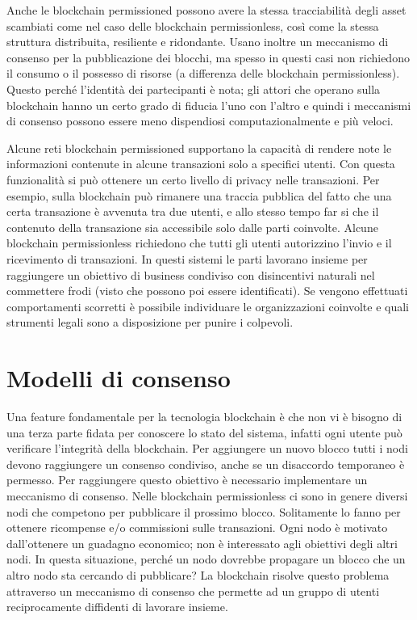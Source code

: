 Anche le blockchain permissioned possono avere la stessa tracciabilità degli asset
scambiati come nel caso delle blockchain permissionless,
così come la stessa struttura distribuita, resiliente e ridondante.
Usano inoltre un meccanismo di consenso per la pubblicazione dei blocchi, ma spesso in questi casi
non richiedono il consumo o il possesso di risorse (a differenza delle blockchain permissionless).
Questo perché l'identità dei partecipanti è nota; gli attori che operano sulla blockchain hanno
un certo grado di fiducia l'uno con l'altro e quindi i meccanismi di consenso possono essere
meno dispendiosi computazionalmente e più veloci.

Alcune reti blockchain permissioned supportano la capacità di rendere note
le informazioni contenute in alcune transazioni solo a specifici utenti.
Con questa funzionalità si può ottenere un certo livello di privacy nelle transazioni. Per esempio,
sulla blockchain può rimanere una traccia pubblica del fatto che una certa transazione è avvenuta tra
due utenti,  e allo stesso tempo far si che il contenuto della transazione
sia accessibile solo dalle parti coinvolte.
Alcune blockchain permissionless richiedono che tutti gli utenti autorizzino l'invio e il
ricevimento di transazioni.
In questi sistemi le parti lavorano insieme per raggiungere un obiettivo
di business condiviso con disincentivi naturali nel commettere frodi (visto che possono poi essere identificati).
Se vengono effettuati comportamenti scorretti è possibile individuare le organizzazioni coinvolte e quali
strumenti legali sono a disposizione per punire i colpevoli.


\section{Modelli di consenso}
\label{intro:modelli-consenso}
Una feature fondamentale per la tecnologia blockchain è che non vi è bisogno di una terza parte fidata
per conoscere lo stato del sistema, infatti ogni utente può verificare l'integrità della blockchain.
Per aggiungere un nuovo blocco tutti i nodi devono raggiungere un consenso condiviso, anche se un
disaccordo temporaneo è permesso. Per raggiungere questo obiettivo è necessario implementare un meccanismo
di consenso. Nelle blockchain permissionless ci sono in genere diversi nodi che competono per pubblicare
il prossimo blocco. Solitamente lo fanno per ottenere ricompense e/o commissioni sulle transazioni.
Ogni nodo è motivato dall'ottenere un guadagno economico; non è interessato agli obiettivi degli altri
nodi. In questa situazione, perché un nodo dovrebbe propagare un blocco che un altro
nodo sta cercando di pubblicare? La blockchain risolve questo problema attraverso un meccanismo di
consenso che permette ad un gruppo di utenti reciprocamente diffidenti di lavorare insieme.




